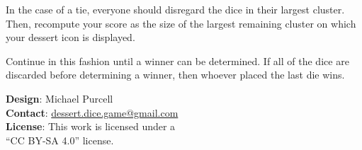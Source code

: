\documentclass[11pt, parskip=half]{scrartcl}
\begin{document}
In the case of a tie, everyone should disregard the dice in their largest cluster. Then, recompute your score as the size of the largest remaining cluster on which your dessert icon is displayed.

Continue in this fashion until a winner can be determined. If all of the dice are discarded before determining a winner, then whoever placed the last die wins.



\vfill
\hrulefill

\small
\textbf{Design}: Michael Purcell\\
\textbf{Contact}: \href{mailto:dessert.dice.game@gmail.com}{dessert.dice.game@gmail.com}\\
\textbf{License}: This work is licensed under a\\``CC BY-SA 4.0'' license.%
 \newpage
\phantom{Dessert Dice}
\end{document}
